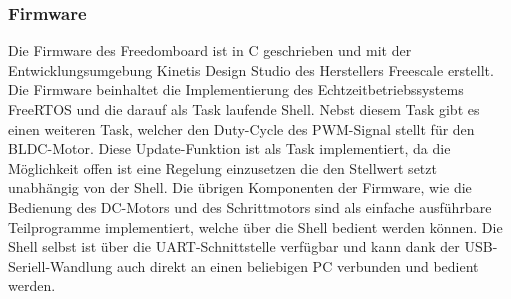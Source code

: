 \subsubsection{Firmware}
Die Firmware des Freedomboard ist in C geschrieben und mit der
Entwicklungsumgebung Kinetis Design Studio des Herstellers
Freescale erstellt. Die Firmware beinhaltet die Implementierung
des Echtzeitbetriebssystems FreeRTOS und die darauf als Task
laufende Shell. Nebst diesem Task gibt es einen weiteren Task,
welcher den Duty-Cycle des PWM-Signal stellt für den BLDC-Motor.
Diese Update-Funktion ist als Task implementiert, da die
Möglichkeit offen ist eine Regelung einzusetzen die den Stellwert
setzt unabhängig von der Shell. Die übrigen Komponenten der
Firmware, wie die Bedienung des DC-Motors und des Schrittmotors
sind als einfache ausführbare Teilprogramme implementiert, welche
über die Shell bedient werden können. Die Shell selbst ist über
die UART-Schnittstelle verfügbar und kann dank der
USB-Seriell-Wandlung auch direkt an einen beliebigen PC verbunden
und bedient werden.


